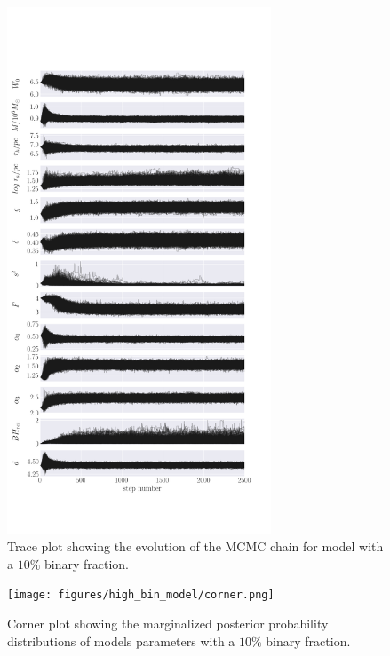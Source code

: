 \begin{figure}
	\centering
	\includegraphics[width=0.7\textwidth]{figures/high_bin_model/walkers.png}
	\caption{Trace plot showing the evolution of the MCMC chain for model with a $10\%$ binary
		fraction.}
	\label{fig:highbin_walkers}
\end{figure}

\begin{figure}
	\centering
	\texttt{[image: figures/high\_bin\_model/corner.png]}
	\caption{Corner plot showing the marginalized posterior probability distributions of models
		parameters with a $10\%$ binary fraction.}
	\label{fig:highbin_corner}
\end{figure}






